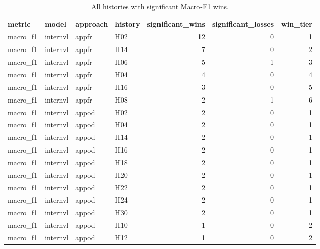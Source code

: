\begin{table}[tbp]
\caption{All histories with significant Macro-F1 wins.}
\label{tab:rq3-macro-f1-significant-history-wins}
\begin{tabular}{llllrrr}
\toprule
metric & model & approach & history & significant\_wins & significant\_losses & win\_tier \\
\midrule
macro\_f1 & internvl & appfr & H02 & 12 & 0 & 1 \\
macro\_f1 & internvl & appfr & H14 & 7 & 0 & 2 \\
macro\_f1 & internvl & appfr & H06 & 5 & 1 & 3 \\
macro\_f1 & internvl & appfr & H04 & 4 & 0 & 4 \\
macro\_f1 & internvl & appfr & H16 & 3 & 0 & 5 \\
macro\_f1 & internvl & appfr & H08 & 2 & 1 & 6 \\
macro\_f1 & internvl & appod & H02 & 2 & 0 & 1 \\
macro\_f1 & internvl & appod & H04 & 2 & 0 & 1 \\
macro\_f1 & internvl & appod & H14 & 2 & 0 & 1 \\
macro\_f1 & internvl & appod & H16 & 2 & 0 & 1 \\
macro\_f1 & internvl & appod & H18 & 2 & 0 & 1 \\
macro\_f1 & internvl & appod & H20 & 2 & 0 & 1 \\
macro\_f1 & internvl & appod & H22 & 2 & 0 & 1 \\
macro\_f1 & internvl & appod & H24 & 2 & 0 & 1 \\
macro\_f1 & internvl & appod & H30 & 2 & 0 & 1 \\
macro\_f1 & internvl & appod & H10 & 1 & 0 & 2 \\
macro\_f1 & internvl & appod & H12 & 1 & 0 & 2 \\
\bottomrule
\end{tabular}
\end{table}

